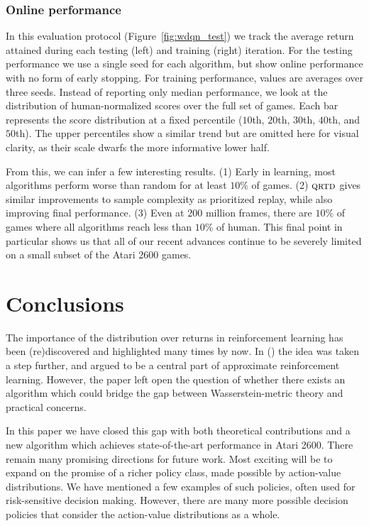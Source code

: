 \documentclass[letterpaper]{article}
\def \qrtd {\textsc{qrtd}}
\newcommand{\citet}[1]{\citeauthor{#1} (\citeyear{#1})}
\begin{document}
\subsubsection{Online performance}
In this evaluation protocol (Figure~\ref{fig:wdqn_test}) we track the average return attained during each testing (left) and training (right) iteration. For the testing performance we use a single seed for each algorithm, but show online performance with no form of early stopping. For training performance, values are averages over three seeds. Instead of reporting only median performance, we look at the distribution of human-normalized scores over the full set of games. Each bar represents the score distribution at a fixed percentile ($10$th, $20$th, $30$th, $40$th, and $50$th). The upper percentiles show a similar trend but are omitted here for visual clarity, as their scale dwarfs the more informative lower half.

From this, we can infer a few interesting results. (1) Early in learning, most algorithms perform worse than random for at least $10\%$ of games. (2) $\qrtd$ gives similar improvements to sample complexity as prioritized replay, while also improving final performance. (3) Even at $200$ million frames, there are $10\%$ of games where all algorithms reach less than $10\%$ of human. This final point in particular shows us that all of our recent advances continue to be severely limited on a small subset of the Atari 2600 games.

\section{Conclusions}
The importance of the distribution over returns in reinforcement learning has been (re)discovered and highlighted many times by now. In \citet{c51} the idea was taken a step further, and argued to be a central part of approximate reinforcement learning. However, the paper left open the question of whether there exists an algorithm which could bridge the gap between Wasserstein-metric theory and practical concerns.

In this paper we have closed this gap with both theoretical contributions and a new algorithm which achieves state-of-the-art performance in Atari 2600.
There remain many promising directions for future work. Most exciting will be to expand on the promise of a richer policy class, made possible by action-value distributions. We have mentioned a few examples of such policies, often used for risk-sensitive decision making. However, there are many more possible decision policies that consider the action-value distributions as a whole.
\end{document}

